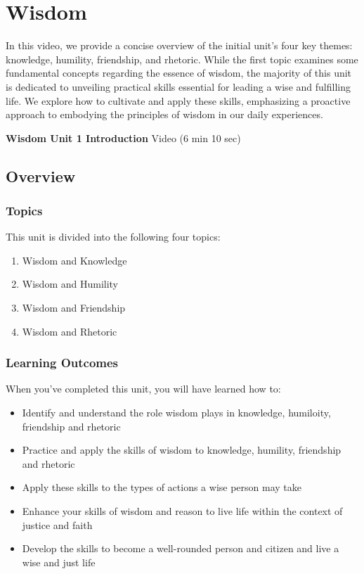 \documentclass[
]{book}
\providecommand{\tightlist}{%
  \setlength{\itemsep}{0pt}\setlength{\parskip}{0pt}}
\begin{document}
\hypertarget{wisdom}{%
\chapter{Wisdom}\label{wisdom}}

In this video, we provide a concise overview of the initial unit's four key themes: knowledge, humility, friendship, and rhetoric. While the first topic examines some fundamental concepts regarding the essence of wisdom, the majority of this unit is dedicated to unveiling practical skills essential for leading a wise and fulfilling life. We explore how to cultivate and apply these skills, emphasizing a proactive approach to embodying the principles of wisdom in our daily experiences.

\textbf{Wisdom Unit 1 Introduction} Video (6 min 10 sec)

\hypertarget{overview}{%
\section*{Overview}\label{overview}}

\hypertarget{topics}{%
\subsection*{Topics}\label{topics}}

This unit is divided into the following four topics:

\begin{enumerate}
\def\labelenumi{\arabic{enumi}.}
\tightlist
\item
  Wisdom and Knowledge
\item
  Wisdom and Humility
\item
  Wisdom and Friendship
\item
  Wisdom and Rhetoric
\end{enumerate}

\hypertarget{learning-outcomes}{%
\subsection*{Learning Outcomes}\label{learning-outcomes}}

When you've completed this unit, you will have learned how to:

\begin{itemize}
\tightlist
\item
  Identify and understand the role wisdom plays in knowledge, humiloity, friendship and rhetoric
\item
  Practice and apply the skills of wisdom to knowledge, humility, friendship and rhetoric
\item
  Apply these skills to the types of actions a wise person may take
\item
  Enhance your skills of wisdom and reason to live life within the context of justice and faith
\item
  Develop the skills to become a well-rounded person and citizen and live a wise and just life
\end{itemize}
\end{document}
